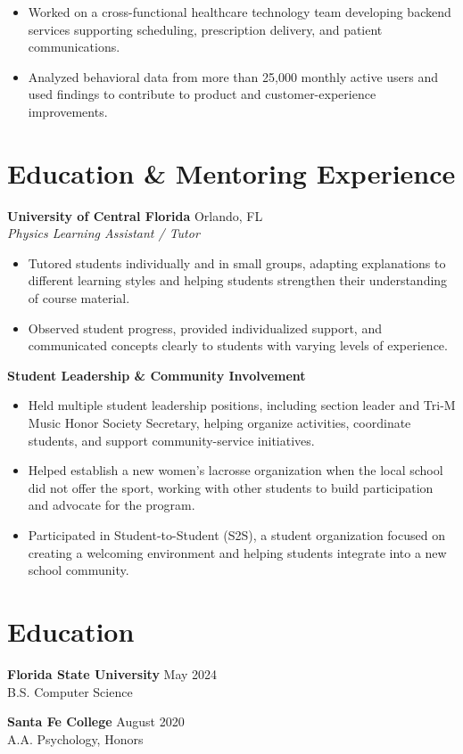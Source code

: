 \documentclass[10pt,letterpaper]{article}
\begin{document}
\begin{itemize}
\item Worked on a cross-functional healthcare technology team developing
backend services supporting scheduling, prescription delivery, and patient
communications.
\item Analyzed behavioral data from more than 25,000 monthly active users and
used findings to contribute to product and customer-experience improvements.
\end{itemize}

\section*{Education \& Mentoring Experience}

\textbf{University of Central Florida} \hfill Orlando, FL\\
\textit{Physics Learning Assistant / Tutor}

\begin{itemize}
\item Tutored students individually and in small groups, adapting explanations
to different learning styles and helping students strengthen their
understanding of course material.
\item Observed student progress, provided individualized support, and
communicated concepts clearly to students with varying levels of experience.
\end{itemize}

\vspace{2pt}

\textbf{Student Leadership \& Community Involvement}

\begin{itemize}
\item Held multiple student leadership positions, including section leader and
Tri-M Music Honor Society Secretary, helping organize activities, coordinate
students, and support community-service initiatives.
\item Helped establish a new women's lacrosse organization when the local
school did not offer the sport, working with other students to build
participation and advocate for the program.
\item Participated in Student-to-Student (S2S), a student organization focused
on creating a welcoming environment and helping students integrate into a new
school community.
\end{itemize}

\section*{Education}

\textbf{Florida State University} \hfill May 2024\\
B.S. Computer Science

\vspace{2pt}

\textbf{Santa Fe College} \hfill August 2020\\
A.A. Psychology, Honors
\end{document}
